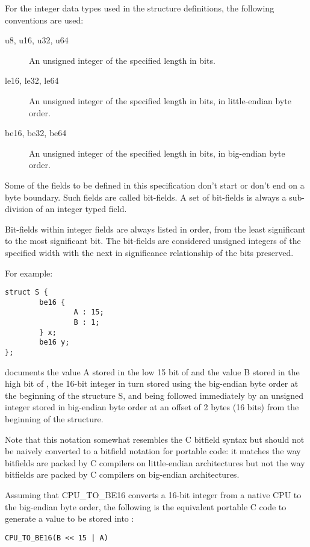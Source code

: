 For the integer data types used in the structure definitions, the following
conventions are used:

\begin{description}
\item[u8, u16, u32, u64] An unsigned integer of the specified length in bits.

\item[le16, le32, le64] An unsigned integer of the specified length in bits,
in little-endian byte order.

\item[be16, be32, be64] An unsigned integer of the specified length in bits,
in big-endian byte order.
\end{description}

Some of the fields to be defined in this specification don't
start or don't end on a byte boundary. Such fields are called bit-fields.
A set of bit-fields is always a sub-division of an integer typed field.

Bit-fields within integer fields are always listed in order,
from the least significant to the most significant bit.  The
bit-fields are considered unsigned integers of the specified
width with the next in significance relationship of the bits
preserved.

For example:
\begin{lstlisting}
struct S {
        be16 {
                A : 15;
                B : 1;
        } x;
        be16 y;
};
\end{lstlisting}
documents the value A stored in the low 15 bit of  and
the value B stored in the high bit of , the 16-bit
integer  in turn stored using the big-endian byte order
at the beginning of the structure S,
and being followed immediately by an unsigned integer 
stored in big-endian byte order at an offset of 2 bytes (16 bits)
from the beginning of the structure.

Note that this notation somewhat resembles the C bitfield syntax but
should not be naively converted to a bitfield notation for portable
code: it matches the way bitfields are packed by C compilers on
little-endian architectures but not the way bitfields are packed by C
compilers on big-endian architectures.

Assuming that CPU_TO_BE16 converts a 16-bit integer from a native
CPU to the big-endian byte order, the following is the equivalent
portable C code to generate a value to be stored into :
\begin{lstlisting}
CPU_TO_BE16(B << 15 | A)
\end{lstlisting}

\newpage

